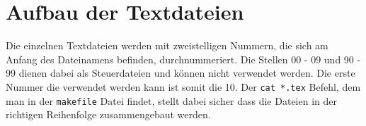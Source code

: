 \section{Aufbau der Textdateien}
\label{aufbau_der_textdateien}

Die einzelnen Textdateien werden mit zweistelligen Nummern, 
die sich am Anfang des Dateinamens befinden,
durchnummeriert.
Die Stellen 00 - 09 und 90 - 99 dienen dabei als Steuerdateien 
und können nicht verwendet werden.
Die erste Nummer die verwendet werden kann ist somit die 10.
Der \verb!cat *.tex! Befehl, 
dem man in der \verb!makefile! Datei findet, 
stellt dabei sicher dass die Dateien in der richtigen 
Reihenfolge zusammengebaut werden.




